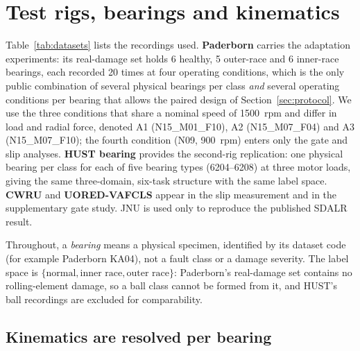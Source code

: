 \section{Test rigs, bearings and kinematics}
\label{sec:data}



Table~\ref{tab:datasets} lists the recordings used. \textbf{Paderborn} \cite{lessmeier2016} carries the adaptation
experiments: its real-damage set holds 6 healthy, 5 outer-race and 6 inner-race bearings, each recorded 20 times at four
operating conditions, which is the only public combination of several physical bearings per class \emph{and} several
operating conditions per bearing that allows the paired design of Section~\ref{sec:protocol}. We use the three conditions
that share a nominal speed of \SI{1500}{rpm} and differ in load and radial force, denoted A1 (N15\_M01\_F10), A2
(N15\_M07\_F04) and A3 (N15\_M07\_F10); the fourth condition (N09, \SI{900}{rpm}) enters only the gate and slip analyses.
\textbf{HUST bearing} \cite{thuan2023hust} provides the second-rig replication: one physical bearing per class for each of
five bearing types (6204--6208) at three motor loads, giving the same three-domain, six-task structure with the same label
space. \textbf{CWRU} \cite{smith2015} and \textbf{UORED-VAFCLS} \cite{sehri2023uored} appear in the slip measurement and in
the supplementary gate study. JNU \cite{li2013jnu} is used only to reproduce the published SDALR result.

Throughout, a \emph{bearing} means a physical specimen, identified by its dataset code (for example Paderborn KA04), not a
fault class or a damage severity. The label space is $\{\text{normal},\text{inner race},\text{outer race}\}$: Paderborn's
real-damage set contains no rolling-element damage, so a ball class cannot be formed from it, and HUST's ball recordings are
excluded for comparability.

\subsection{Kinematics are resolved per bearing}
\label{sec:kinematics}

